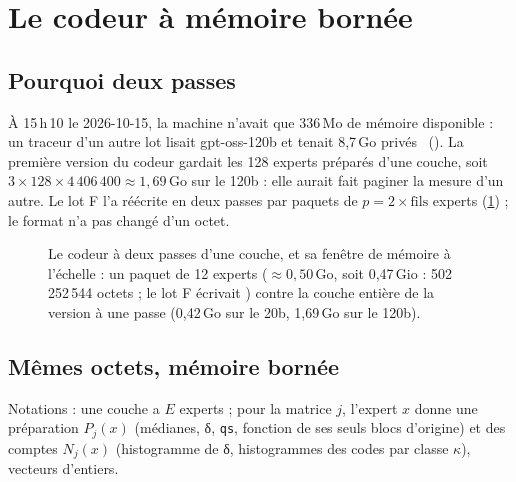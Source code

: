 \section{Le codeur à mémoire bornée}\label{t2fmt:sec:codeur}

\subsection{Pourquoi deux passes}

À 15\,h\,10 le 2026-10-15, la machine n'avait que 336\,Mo de mémoire disponible : un traceur d'un autre lot lisait gpt-oss-120b et tenait 8,7\,Go privés \mes~(). La première version du codeur gardait les 128 experts préparés d'une couche, soit $3 \times 128 \times 4\,406\,400 \approx 1{,}69$\,Go sur le 120b \calc : elle aurait fait paginer la mesure d'un autre. Le lot F l'a réécrite en deux passes par paquets de $p = 2 \times \text{fils}$ experts (\cref{t2fmt:fig:codeur}) ; le format n'a pas changé d'un octet.

\begin{figure}[ht]
\centering
\TdFmtCodeur
\caption[Le codeur à deux passes et sa fenêtre]{Le codeur à deux passes d'une couche, et sa fenêtre de mémoire à l'échelle : un paquet de 12 experts ($\approx 0{,}50$\,Go, soit 0,47\,Gio : 502\,252\,544 octets ; le lot F écrivait ) contre la couche entière de la version à une passe (0,42\,Go sur le 20b, 1,69\,Go sur le 120b).}
\label{t2fmt:fig:codeur}
\end{figure}

\subsection{Mêmes octets, mémoire bornée}

Notations : une couche a $E$ experts ; pour la matrice $j$, l'expert $x$ donne une préparation $P_j(x)$ (médianes, δ, \texttt{qs}, fonction de ses seuls blocs d'origine) et des comptes $N_j(x)$ (histogramme de δ, histogrammes des codes par classe $\kappa$), vecteurs d'entiers.

